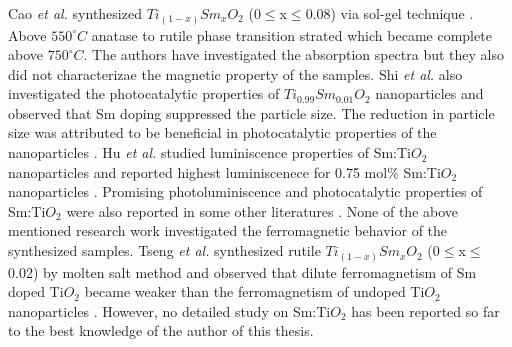 \documentclass[main.tex]{subfiles}
\begin{document}
Cao \textit{et al.} synthesized $Ti_{(1-x)}Sm_{x}O_{2}$ (0$\leq$x$\leq$0.08) via sol-gel technique \cite{cao2013luminescence}. Above $550 ^{\circ}C$ anatase to rutile phase transition strated which became complete above $750 ^{\circ}C$. The authors have investigated the absorption spectra but they also did not characterizae the magnetic property of the samples. Shi \textit{et al.} also investigated the photocatalytic properties of $Ti_{0.99}Sm_{0.01}O_{2}$ nanoparticles and observed that Sm doping suppressed the particle size. The reduction in particle size was attributed to be beneficial in photocatalytic properties of the nanoparticles \cite{shi2008photocatalytic}. Hu \textit{et al.} studied luminiscence properties of Sm:Ti$O_2$ nanoparticles and reported highest luminiscenece for 0.75 mol$\%$ Sm:Ti$O_2$ nanoparticles \cite{hu2007photoluminescence}. Promising photoluminiscence and photocatalytic properties of Sm:Ti$O_2$ were also reported in some other literatures \cite{kiisk2005photoluminescence, park2011photoluminescence, dinkar2016sm, ma2010synthesis, xiang2017enhanced}. None of the above mentioned research work investigated the ferromagnetic behavior of the synthesized samples. Tseng \textit{et al.} synthesized rutile $Ti_{(1-x)}Sm_{x}O_{2}$ (0$\leq$x$\leq$0.02) by molten salt method and observed that dilute ferromagnetism of Sm doped Ti$O_2$ became weaker than the ferromagnetism of undoped Ti$O_2$ nanoparticles  \cite{tseng2016magnetic}. However, no detailed study on Sm:Ti$O_2$ has been reported so far to the best knowledge of the author of this thesis.  




\thispagestyle{fancy}
\end{document}

